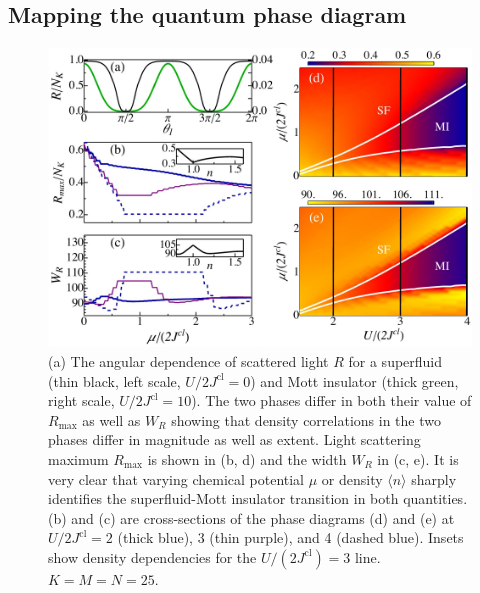 \subsection{Mapping the quantum phase diagram}

\begin{figure}[htbp!]  
  \centering
  \includegraphics[width=\linewidth]{oph11}
  \caption[Mapping the Bose-Hubbard Phase Diagram]{(a) The angular
    dependence of scattered light $R$ for a superfluid (thin black,
    left scale, $U/2J^\text{cl} = 0$) and Mott insulator (thick green,
    right scale, $U/2J^\text{cl} =10$). The two phases differ in both
    their value of $R_\text{max}$ as well as $W_R$ showing that
    density correlations in the two phases differ in magnitude as well
    as extent. Light scattering maximum $R_\text{max}$ is shown in (b,
    d) and the width $W_R$ in (c, e).  It is very clear that varying
    chemical potential $\mu$ or density $\langle n\rangle$ sharply
    identifies the superfluid-Mott insulator transition in both
    quantities. (b) and (c) are cross-sections of the phase diagrams
    (d) and (e) at $U/2J^\text{cl}=2$ (thick blue), 3 (thin purple),
    and 4 (dashed blue). Insets show density dependencies for the
    $U/(2 J^\text{cl}) = 3$ line. $K=M=N=25$.}
	\label{fig:SFMI}
\end{figure}

